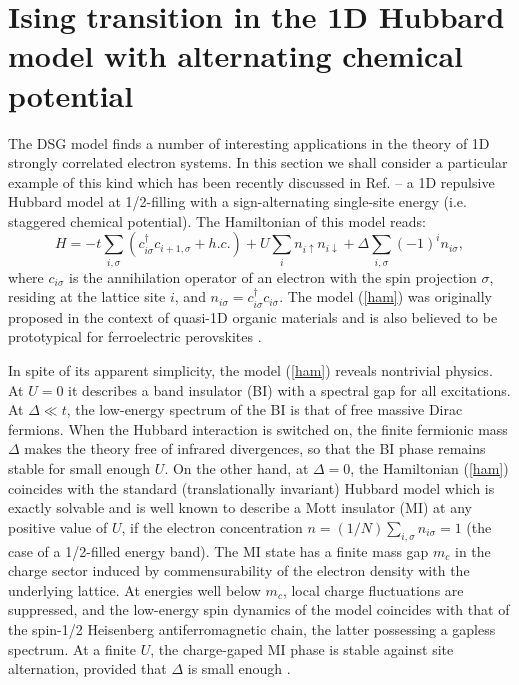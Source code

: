 \section{Ising transition in the 1D Hubbard model with alternating chemical potential}

The DSG model finds a number of interesting applications in the theory of
1D strongly correlated electron systems.
In this section we shall consider a particular example of this kind
which has been recently discussed in Ref.\cite{FGN} -- a 1D repulsive Hubbard
model
at 1/2-filling with a sign-alternating single-site energy (i.e. staggered
chemical
potential). The Hamiltonian of this model reads:
\begin{equation}
H = - t \sum_{i,\sigma} \left( c^{\dagger}_{i\sigma} c_{i+1,\sigma} + h.c. \right)
+ U \sum_i n_{i\uparrow} n_{i\downarrow}
+ \Delta \sum_{i,\sigma} (-1)^i n_{i\sigma},
\label{ham}
\end{equation}
where $c_{i\sigma}$ is the annihilation operator of an electron with the spin
projection
$\sigma$, residing at the lattice site $i$,
and $n_{i\sigma} = c^{\dagger}_{i\sigma} c_{i\sigma}$.
The model (\ref{ham}) was originally proposed in the context of quasi-1D organic
materials \cite{nagaosa} and is also believed to be prototypical
for ferroelectric perovskites \cite{egami}.

In spite of its apparent simplicity, the model (\ref{ham}) reveals nontrivial
physics. At $U = 0$ it describes a band insulator (BI) with a spectral gap for
all excitations. At $\Delta \ll t$,
the low-energy spectrum of the BI is that of free massive
Dirac fermions.
When the Hubbard interaction is switched on,
the finite fermionic mass $\Delta$ makes the theory
free of infrared divergences, so that the BI phase remains stable
for small enough $U$.
On the other hand, at $\Delta = 0$, the Hamiltonian (\ref{ham})
coincides with the standard (translationally invariant) Hubbard model which
is exactly solvable \cite{LW} and is well known to
describe a Mott insulator (MI) at any positive value of $U$,
if the electron concentration $n = (1/N)\sum_{i,\sigma} n_{i\sigma} = 1$
(the case of a 1/2-filled energy band).
The MI state has a finite mass gap $m_c$ in the charge
sector induced by commensurability of the electron density with
the underlying lattice. At energies well below $m_c$,
local charge fluctuations are suppressed, and the low-energy
spin dynamics of the model
coincides with that of the spin-1/2 Heisenberg antiferromagnetic chain,
the latter possessing a gapless spectrum.
At a finite $U$, the charge-gaped MI phase is stable against site alternation,
provided that $\Delta$ is small enough \cite{nagaosa}.

